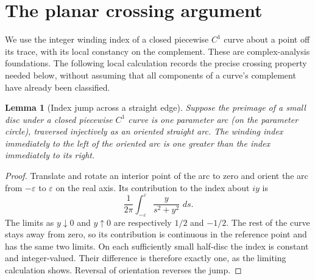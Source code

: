 \documentclass[11pt,oneside]{book}
\newtheorem{lemma}[theorem]{Lemma}
\theoremstyle{definition}
\theoremstyle{remark}\newtheorem{remark}[theorem]{Remark}
\newcommand{\dd}{\,d}\newcommand{\id}{\operatorname{id}}
\begin{document}
\section{The planar crossing argument}

We use the integer winding index of a closed piecewise \(C^1\) curve
about a point off its trace, with its local constancy on the complement.
These are complex-analysis foundations. The following local calculation
records the precise crossing property needed below, without assuming
that all components of a curve's complement have already been classified.

\begin{lemma}[Index jump across a straight edge]\label{d13:13:index-jump}
Suppose the preimage of a small disc under a closed piecewise \(C^1\)
curve is one parameter arc (on the parameter circle), traversed
injectively as an oriented straight arc. The winding
index immediately to the left of the oriented arc is one greater than
the index immediately to its right.
\end{lemma}
\begin{proof}
Translate and rotate an interior point of the arc to zero and orient
the arc from \(-\varepsilon\) to \(\varepsilon\) on the real axis.
Its contribution to the index about \(iy\) is
\[
 \frac1{2\pi}\int_{-\varepsilon}^{\varepsilon}
             \frac{y}{s^2+y^2}\,\dd s .
\]
The limits as \(y\downarrow0\) and \(y\uparrow0\) are respectively
\(1/2\) and \(-1/2\). The rest of the curve stays away from zero, so its
contribution is continuous in the reference point and has the same
two limits. On each sufficiently small half-disc the index is constant
and integer-valued. Their difference is therefore exactly one, as the
limiting calculation shows. Reversal of orientation reverses the jump.
\end{proof}
\end{document}
